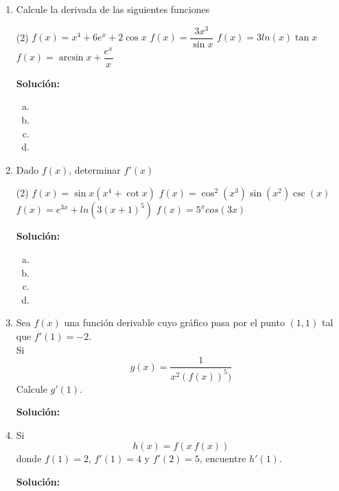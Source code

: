 \documentclass[12pt]{article}
\newenvironment{solucion}
{\begin{mdframed}[backgroundcolor=black!10]
		{\bf Solución:}\\
	}
	{
	\end{mdframed}
}
\newenvironment{preguntas}
{\begin{enumerate}\itemsep12pt
	}
	{
	\end{enumerate}
}
\begin{document}
\begin{preguntas}
\item Calcule la derivada de las siguientes funciones
\begin{tasks}(2)
\task $f(x) = x^4 + 6e^x + 2\cos x$
\task $f(x) = \dfrac{3x^3}{\sin x}$
\task $f(x) = 3ln(x)\tan x$
\task $f(x) = \arcsin x + \dfrac{e^x}{x}$
\end{tasks}
\begin{solucion}

\begin{enumerate}[a)]
\item 
\item 
\item 
\item 
\end{enumerate}
\end{solucion}
\item Dado $f(x)$, determinar $f'(x)$
\begin{tasks}(2)
\task $f(x) = \sin x(x^4+\cot x)$
\task $f(x) = \cos ^2 (x^3) \sin(x^2)\csc(x)$
\task $f(x) = e^{3x} + ln(3(x+1)^5)$
\task $f(x) = 5^x cos(3x)$
\end{tasks}
\begin{solucion}

\begin{enumerate}[a)]
\item 
\item 
\item 
\item 
\end{enumerate}
\end{solucion}
\item Sea $f(x)$ una función derivable cuyo gráfico pasa por el punto $(1,1)$ tal que $f'(1) = -2$.\\
Si 
$$g(x) = \dfrac{1}{x^2(f(x))^5)}$$
Calcule $g'(1)$.
\begin{solucion}

\end{solucion}
\item Si 
$$h(x) = f(x\ f(x))$$
donde $f(1)=2$, $f'(1)=4$ y $f'(2) = 5$, encuentre $h'(1)$.
\begin{solucion}

\end{solucion}
\end{preguntas}
\end{document}
